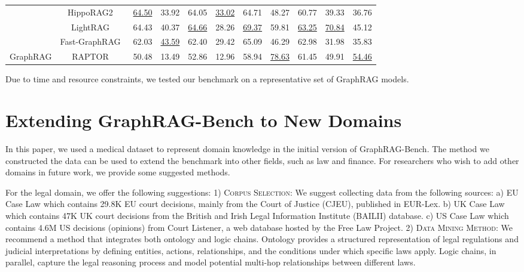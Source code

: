 \documentclass{article} %
\begin{document}
\begin{table}[!t]
{\begin{tabular}{c|c|cc|cc|cc|ccc}
 & HippoRAG2~\citep{gutiérrez2025HippoRAG2} & \underline{64.50} & 33.92 & 64.05 & \underline{33.02} & 64.71 & 48.27 & 60.77 & 39.33 & 36.76 \\
 & LightRAG~\citep{guo2024lightrag} & 64.43 & 40.37 & \underline{64.66} & 28.26 & \underline{69.37} & 59.81 & \underline{63.25} & \underline{70.84} & 45.12 \\
 & Fast-GraphRAG~\citep{fastgraphrag2024} & 62.03 & \underline{43.59} & 62.40 & 29.42 & 65.09 & 46.29 & 62.98 & 31.98 & 35.83 \\
\multirow{-7}{*}{GraphRAG} & RAPTOR~\citep{sarthi2024raptor} & 50.48 & 13.49 & 52.86 & 12.96 & 58.94 & \underline{78.63} & 61.45 & 49.91 & \underline{54.46} \\
\bottomrule
\end{tabular}
}
\vspace{-2mm}
\begin{center}
\footnotesize *Due to time and resource constraints, we tested our benchmark on a representative set of GraphRAG models.
\end{center}
\label{tab:appedix-generate2}
\end{table}

\section{Extending GraphRAG-Bench to New Domains}\label{sec:appendix_extend}
In this paper, we used a medical dataset to represent domain knowledge in the initial version of GraphRAG-Bench. The method we constructed the data can be used to extend the benchmark into other fields, such as law and finance. For researchers who wish to add other domains in future work, we provide some suggested methods. 

For the legal domain, we offer the following suggestions: 1) \textsc{Corpus Selection}: We suggest collecting data from the following sources: a) EU Case Law which contains 29.8K EU court decisions, mainly from the Court of Justice (CJEU), published in EUR-Lex. b) UK Case Law which contains 47K UK court decisions from the British and Irish Legal Information Institute (BAILII) database. c) US Case Law which contains 4.6M US decisions (opinions) from Court Listener, a web database hosted by the Free Law Project. 2) \textsc{Data Mining Method}: We recommend a method that integrates both ontology and logic chains. Ontology provides a structured representation of legal regulations and judicial interpretations by defining entities, actions, relationships, and the conditions under which specific laws apply. Logic chains, in parallel, capture the legal reasoning process and model potential multi-hop relationships between different laws. 
\end{document}
